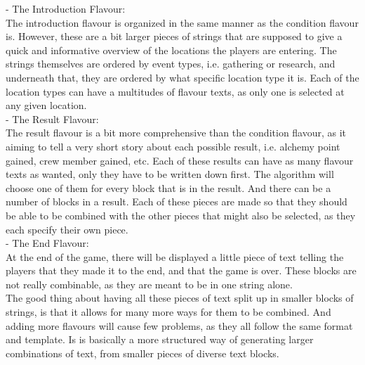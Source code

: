 - The Introduction Flavour:\\

The introduction flavour is organized in the same manner as the condition flavour is. However, these are a bit larger pieces of strings that are supposed to give a quick and informative overview of the locations the players are entering. The strings themselves are ordered by event types, i.e. gathering or research, and underneath that, they are ordered by what specific location type it is. Each of the location types can have a multitudes of flavour texts, as only one is selected at any given location.\\

- The Result Flavour:\\

The result flavour is a bit more comprehensive than the  condition flavour, as it aiming to tell a very short story about each possible result, i.e. alchemy point gained, crew member gained, etc.
Each of these results can have as many flavour texts as wanted, only they have to be written down first. The algorithm will choose one of them for every block that is in the result. And there can be a number of blocks in a result. Each of these pieces are made so that they should be able to be combined with the other pieces that might also be selected, as they each specify their own piece. \\

- The End Flavour:\\

At the end of the game, there will be displayed a little piece of text telling the players that they made it to the end, and that the game is over. These blocks are not really combinable, as they are meant to be in one string alone.\\

The good thing about having all these pieces of text split up in smaller blocks of strings, is that it allows for many more ways for them to be combined. And adding more flavours will cause few problems, as they all follow the same format and template. Is is basically a more structured way of generating larger combinations of text, from smaller pieces of diverse text blocks.\\\\


